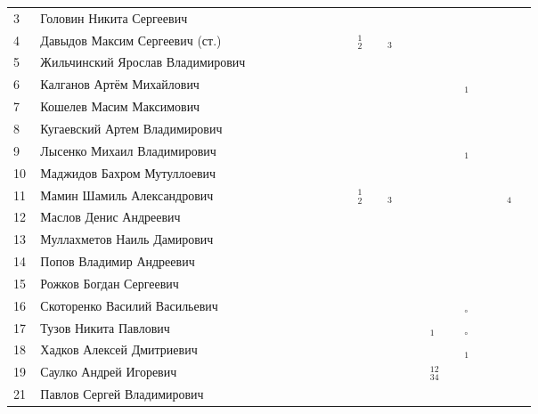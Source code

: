 \documentclass[a4paper,landscape,11pt]{article}
\newcommand*\OK{&\small \ding{51}$\!\!_\circ$} %
\newcommand*\ok{&{\small \ding{51}}} %
\newcommand*\no{&{\small }} %
\newcommand*\da{&{\small\ding{48}$\!\!_1$}} %
\newcommand*\dab{&{\small\ding{48}$\!\!^1_2$}} %
\newcommand*\dabcd{&{\small\ding{48}$\!\!^{12}_{34}$}} %
\newcommand*\dc{&{\small\ding{48}$\!\!_3$}} %
\newcommand*\dd{&{\small\ding{48}$\!\!_4$}} %
\begin{document}
\begin{tabular}{p{7pt}|l|p{6pt}p{6pt}p{6pt}p{6pt}p{6pt}p{6pt}p{6pt}p{6pt}p{6pt}p{6pt}p{6pt}p{6pt}p{6pt}p{6pt}p{6pt}p{6pt}p{6pt}p{6pt}p{6pt}p{6pt}}
 3\,&Головин Никита Сергеевич          \ok\no\no\ok\no\no\no\ok\ok \ok   \\
 4\,&Давыдов Максим Сергеевич (ст.)    \ok\ok\ok\ok\ok\ok\ok\ok\dab\ok\dc\ok\ok\ok   \ok\ok\ok\ok\ok\\
 5\,&Жильчинский Ярослав Владимирович  \ok\ok\ok\ok\ok\ok\ok\ok\ok \ok\ok\ok\ok\no   \no\ok\ok\ok\ok\\
 6\,&Калганов Артём Михайлович         \ok\no\ok\ok\ok\no\ok\ok\ok \ok\ok\ok\ok\no   \ok\da\ok\ok\ok\\
 7\,&Кошелев Масим Максимович          \no\no\no\no\no\no\no\no\no \ok   \\
 8\,&Кугаевский Артем Владимирович     \ok\no\no\ok\ok\no\no\ok\ok \ok\no\ok\no\no   \no\ok\no\no\no\\
 9\,&Лысенко Михаил Владимирович       \ok\ok\ok\ok\ok\ok\ok\ok\ok \ok\ok\ok\ok\ok   \ok\da\ok\ok\ok\\
10\,&Маджидов Бахром Мутуллоевич       \\
11\,&Мамин Шамиль Александрович        \ok\no\no\ok\ok\no\ok\ok\dab\ok\dc\ok\ok\no   \ok\ok\ok\ok\dd\\
\midrule
12\,&Маслов Денис Андреевич            \ok\ok\ok\ok\ok\no\no\ok\ok \ok\ok\ok\ok\no   \ok\no\no\no\no\\
13\,&Муллахметов Наиль Дамирович       \ok\ok\no\ok\no\no\ok\no\ok \ok\no\no\ok\no   \no\ok\no\no\no\\
14\,&Попов Владимир Андреевич          \ok\ok\no\ok\ok\ok\ok\ok\ok \ok \\
15\,&Рожков Богдан Сергеевич           \\
16\,&Скоторенко Василий Васильевич     \ok\ok\ok\ok\ok\ok\ok\ok\ok \ok\ok\ok\ok\no   \ok\OK\ok\no\ok\\
17\,&Тузов Никита Павлович             \ok\ok\ok\ok\ok\ok\ok\ok\ok \ok\ok\ok\ok\da   \ok\OK\ok\ok\ok\\
18\,&Хадков Алексей Дмитриевич         \ok\no\ok\ok\ok\ok\ok\ok\ok \ok\ok\ok\ok\ok   \ok\da\ok\ok\ok\\
19\,&Саулко Андрей Игоревич            \ok\no\no\ok\ok\no\no\ok\ok \ok\ok\ok\ok\dabcd\ok\no\ok\ok\ok\\
21\,&Павлов Сергей Владимирович        \ok\ok\no\ok\no\no\no\ok\no \no\ok\no\no\no\\   
\bottomrule
\end{tabular} 
\end{document}
